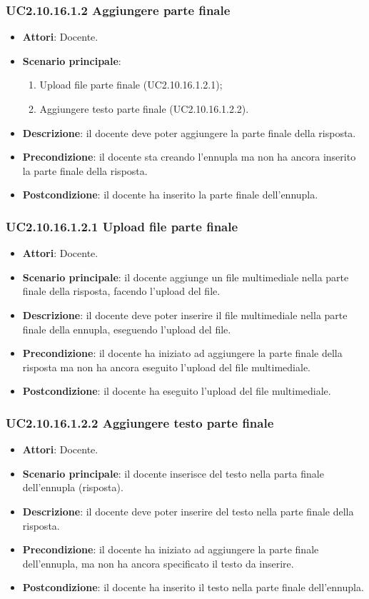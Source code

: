 \subsubsection{UC2.10.16.1.2 Aggiungere parte finale}
\begin{itemize}
\item \textbf{Attori}: Docente.
\item \textbf{Scenario principale}:
\begin{enumerate}
\item Upload file parte finale (UC2.10.16.1.2.1);
\item Aggiungere testo parte finale (UC2.10.16.1.2.2).
\end{enumerate}
\item \textbf{Descrizione}: il docente deve poter aggiungere la parte finale della risposta.
\item \textbf{Precondizione}: il docente sta creando l'ennupla ma non ha ancora inserito la parte finale della risposta.
\item \textbf{Postcondizione}: il docente ha inserito la parte finale dell'ennupla.
\end{itemize}
\subsubsection{UC2.10.16.1.2.1 Upload file parte finale}
\begin{itemize}
\item \textbf{Attori}: Docente.
\item \textbf{Scenario principale}: il docente aggiunge un file multimediale nella parte finale della risposta, facendo l'upload del file.
\item \textbf{Descrizione}: il docente deve poter inserire il file multimediale nella parte finale della ennupla, eseguendo l'upload del file.
\item \textbf{Precondizione}: il docente ha iniziato ad aggiungere la parte finale della risposta ma non ha ancora eseguito l'upload del file multimediale.
\item \textbf{Postcondizione}: il docente ha eseguito l'upload del file multimediale.
\end{itemize}
\subsubsection{UC2.10.16.1.2.2 Aggiungere testo parte finale}
\begin{itemize}
\item \textbf{Attori}: Docente.
\item \textbf{Scenario principale}: il docente inserisce del testo nella parta finale dell'ennupla (risposta).
\item \textbf{Descrizione}: il docente deve poter inserire del testo nella parte finale della risposta.
\item \textbf{Precondizione}: il docente ha iniziato ad aggiungere la parte finale dell'ennupla, ma non ha ancora specificato il testo da inserire.
\item \textbf{Postcondizione}: il docente ha inserito il testo nella parte finale dell'ennupla.
\end{itemize}
